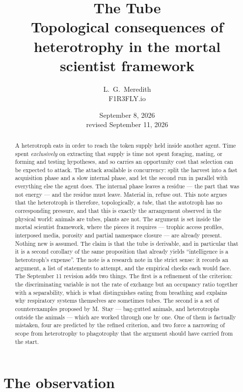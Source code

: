 \documentclass[11pt]{article}
\title{\bfseries The Tube\\[.35em]
\large Topological consequences of heterotrophy in the mortal scientist framework}
\author{L.\ G.\ Meredith\\ \small F1R3FLY.io}
\date{September 8, 2026 \\ \small revised September 11, 2026}
\theoremstyle{plain}
\theoremstyle{definition}
\begin{document}
\maketitle

\begin{abstract}
A heterotroph eats in order to reach the token supply held inside another agent. Time spent
\emph{exclusively} on extracting that supply is time not spent foraging, mating, or forming and
testing hypotheses, and so carries an opportunity cost that selection can be expected to attack. The
attack available is concurrency: split the harvest into a fast acquisition phase and a slow internal
phase, and let the second run in parallel with everything else the agent does. The internal phase
leaves a residue --- the part that was not energy --- and the residue must leave. Material in, refuse
out. This note argues that the heterotroph is therefore, topologically, a \emph{tube}, that the
autotroph has no corresponding pressure, and that this is exactly the arrangement observed in the
physical world: animals are tubes, plants are not. The argument is set inside the mortal scientist
framework, where the pieces it requires --- trophic access profiles, interposed media, porosity and
partial namespace closure --- are already present. Nothing new is assumed. The claim is that the tube
is derivable, and in particular that it is a second corollary of the same proposition that already
yields ``intelligence is a heterotroph's expense''. The note is a research note in the strict sense:
it records an argument, a list of statements to attempt, and the empirical checks each would face.
The September 11 revision adds two things. The first is a refinement of the criterion: the
discriminating variable is not the rate of exchange but an occupancy ratio together with a
separability, which is what distinguishes eating from breathing and explains why respiratory systems
themselves are sometimes tubes. The second is a set of counterexamples proposed by M.\ Stay ---
bag-gutted animals, and heterotrophs outside the animals --- which are worked through one by one. One
of them is factually mistaken, four are predicted by the refined criterion, and two force a narrowing
of scope from heterotrophy to phagotrophy that the argument should have carried from the start.
\end{abstract}

\section{The observation}
\label{sec:obs}
\end{document}
